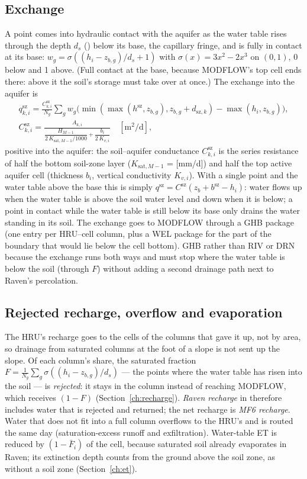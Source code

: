 \subsection{Exchange}
A point comes into hydraulic contact with the aquifer as the water table rises through the depth $d_s$
() below its base, the capillary fringe, and is fully in contact at its base:
$w_g=\sigma((h_i-z_{b,g})/d_s+1)$ with $\sigma(x)=3x^2-2x^3$ on $(0,1)$, 0 below and 1 above. (Full contact at the base,
because MODFLOW's top cell ends there: above it the soil's storage must take over at once.) The exchange into the
aquifer is
\begin{gather}
q^{\mathrm{sz}}_{k,i}=\frac{C^{\mathrm{sz}}_{k,i}}{N_g}\sum_gw_g\Big(\min(\max(h^{\mathrm{sz}},z_{b,g}),z_{b,g}+d_{\mathrm{sz},k})-\max(h_i,z_{b,g})\Big),\\
C^{\mathrm{sz}}_{k,i}=\frac{A_{k,i}}{\dfrac{H_{M-1}}{2\,K_{\mathrm{sat},M-1}/1000}+\dfrac{b_i}{2\,K_{v,i}}}\quad[\mathrm{m^2/d}],
\end{gather}
positive into the aquifer: the soil--aquifer conductance $C^{\mathrm{sz}}_{k,i}$ is the series resistance of half the bottom soil-zone layer
($K_{\mathrm{sat},M-1}$ =  [mm/d]) and half the top active aquifer cell (thickness $b_i$, vertical conductivity
$K_{v,i}$). With a single point and the water table above the base this is simply $q^{\mathrm{sz}}=C^{\mathrm{sz}}(z_b+b^{\mathrm{sz}}-h_i)$: water flows up
when the water table is above the soil water level and down when it is below; a point in contact while the water table
is still below its base only drains the water standing in its soil. The exchange goes to MODFLOW through a GHB package  (one entry per
HRU--cell column, plus a WEL package  for the part of the boundary that would lie below the cell bottom).
GHB rather than RIV or DRN because the exchange runs both ways and must stop where the water table is below the soil
(through $F$) without adding a second drainage path next to Raven's percolation.

\subsection{Rejected recharge, overflow and evaporation}
The HRU's recharge goes to the cells of the columns that gave it up, not by area, so drainage from saturated columns at
the foot of a slope is not sent up the slope. Of each column's share, the saturated fraction $F=\frac1{N_g}\sum_g\sigma((h_i-z_{b,g})/d_s)$ --- the points where the
water table has risen into the soil --- is \emph{rejected}: it stays in the column instead of reaching MODFLOW, which
receives $(1-F)$ (Section~\ref{ch:recharge}). \emph{Raven recharge} in  therefore includes water that is
rejected and returned; the net recharge is \emph{MF6 recharge}. Water that does not fit into a full
column overflows to the HRU's  and is routed the same day (saturation-excess runoff and
exfiltration). Water-table ET is reduced by $(1-\bar F_i)$ of the cell, because saturated soil already evaporates in
Raven; its extinction depth counts from the ground above the soil zone, as without a soil zone (Section~\ref{ch:et}).


